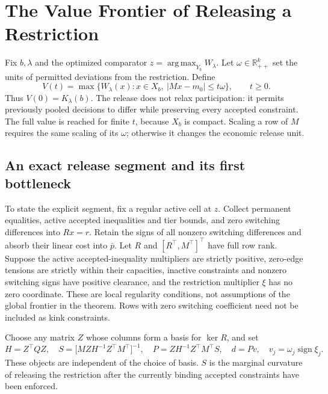 \documentclass[11pt,letterpaper]{article}
\theoremstyle{definition}\newtheorem{assumption}[theorem]{Assumption}
\newcommand{\R}{\mathbb R}\newcommand{\E}{\mathbb E}
\newcommand{\argmax}{\operatorname*{arg\,max}}
\begin{document}
\section{The Value Frontier of Releasing a Restriction}\label{sec:release}
Fix $b,\lambda$ and the optimized comparator $z=\argmax_{Y_b}W_\lambda$. Let $\omega\in\R^k_{++}$ set the units of permitted deviations from the restriction. Define
\begin{equation}\label{eq:release}
 V(t)=\max\{W_\lambda(x):x\in X_b,\ |Mx-m_0|\leq t\omega\},\qquad t\geq0.
\end{equation}
Thus $V(0)=K_\lambda(b)$. The release does not relax participation: it permits previously pooled decisions to differ while preserving every accepted constraint. The full value is reached for finite $t$, because $X_b$ is compact. Scaling a row of $M$ requires the same scaling of its $\omega$; otherwise it changes the economic release unit.

\subsection{An exact release segment and its first bottleneck}
To state the explicit segment, fix a regular active cell at $z$. Collect permanent equalities, active accepted inequalities and tier bounds, and zero switching differences into $Rx=r$. Retain the signs of all nonzero switching differences and absorb their linear cost into $\bar p$. Let $R$ and $[R^\top,M^\top]^\top$ have full row rank. Suppose the active accepted-inequality multipliers are strictly positive, zero-edge tensions are strictly within their capacities, inactive constraints and nonzero switching signs have positive clearance, and the restriction multiplier $\xi$ has no zero coordinate. These are local regularity conditions, not assumptions of the global frontier in the theorem. Rows with zero switching coefficient need not be included as kink constraints.

Choose any matrix $Z$ whose columns form a basis for $\ker R$, and set
\begin{equation}\label{eq:release-matrices}
 H=Z^\top QZ,\quad
 S=\bigl[MZH^{-1}Z^\top M^\top\bigr]^{-1},\quad
 P=ZH^{-1}Z^\top M^\top S,\quad
 d=P v,\quad v_j=\omega_j\operatorname{sign}\xi_j.
\end{equation}
These objects are independent of the choice of basis. $S$ is the marginal curvature of releasing the restriction after the currently binding accepted constraints have been enforced.
\end{document}
